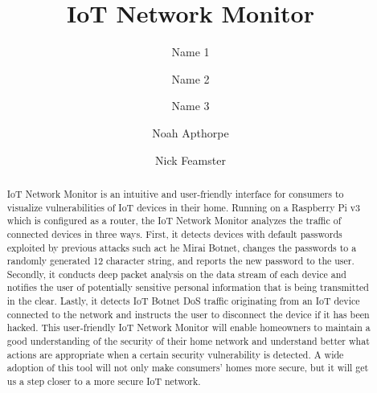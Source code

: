 \documentclass[sigconf]{acmart}
\begin{document}
\title{IoT Network Monitor} 
\author{Name 1}
\author{Name 2}
\author{Name 3}
\author{Noah Apthorpe}
\author{Nick Feamster}

\begin{abstract}
IoT Network Monitor is an intuitive and user-friendly interface for consumers to visualize vulnerabilities of IoT devices in their home. Running on a Raspberry Pi v3 which is configured as a router, the IoT Network Monitor analyzes the traffic of connected devices in three ways. First, it detects devices with default passwords exploited by previous attacks such act he Mirai Botnet, changes the passwords to a randomly generated 12 character string, and reports the new password to the user. Secondly, it conducts deep packet analysis on the data stream of each device and notifies the user of potentially sensitive personal information that is being transmitted in the clear. Lastly, it detects IoT Botnet DoS traffic originating from an IoT device connected to the network and instructs the user to disconnect the device if it has been hacked. This user-friendly IoT Network Monitor will enable homeowners to maintain a good understanding of the security of their home network and understand better what actions are appropriate when a certain security vulnerability is detected. A wide adoption of this tool will not only make consumers’ homes more secure, but it will get us a step closer to a more secure IoT network.
\end{abstract}


\maketitle




\end{document}
